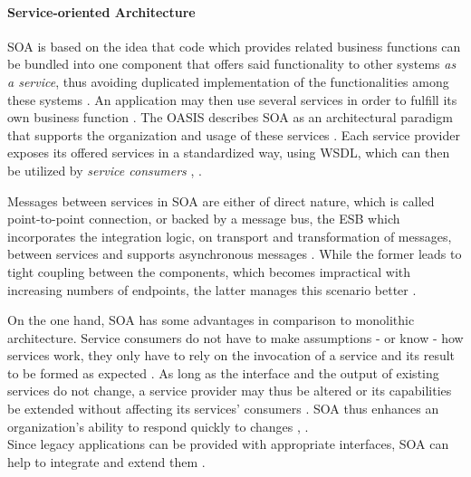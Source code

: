 
\paragraph{Service-oriented Architecture} %
\label{par:service_oriented_architecture}
\ac{SOA} is based on the idea that code which provides related business functions can be bundled into one component that offers said functionality to other systems \emph{as a service}, thus avoiding duplicated implementation of the functionalities among these systems \cite[p.8]{Hohpe2004Enterprise}.
An application may then use several services in order to fulfill its own business function \cite[p.~390]{Papazoglou2007Service}.
The \ac{OASIS} describes \ac{SOA} as an architectural paradigm that supports the organization and usage of these services \cite{Standards2006Reference}. Each service provider exposes its offered services in a standardized way, \eg using \ac{WSDL}, which can then be utilized by \emph{service consumers} \cite[p.~390]{Papazoglou2007Service}, \cite[p.~17]{Strimbei2015Software}.

Messages between services in \ac{SOA} are either of direct nature, which is called point-to-point connection, or backed by a message bus, the \ac{ESB} which incorporates the integration logic, \eg on transport and transformation of messages, between services and supports asynchronous messages \cite[p.~393]{Papazoglou2007Service}. While the former leads to tight coupling between the components, which becomes impractical with increasing numbers of endpoints, the latter manages this scenario better \cite[p.~393]{Papazoglou2007Service}.

On the one hand, \ac{SOA} has some advantages in comparison to monolithic architecture.
Service consumers do not have to make assumptions - or know - how services work, they only have to rely on the invocation of a service and its result to be formed as expected \cite[p.~390]{Papazoglou2007Service}. As long as the interface and the output of existing services do not change, a service provider may thus be altered or its capabilities be extended without affecting its services' consumers \cite[p.~390]{Papazoglou2007Service}. \ac{SOA} thus enhances an organization’s ability to respond quickly to changes \cite[p.~390]{Papazoglou2007Service}, \cite[p.~254]{Choi2010Implementing}. \\
Since legacy applications can be provided with appropriate interfaces, SOA can help to integrate and extend them \cite[p.~390]{Papazoglou2007Service}.

